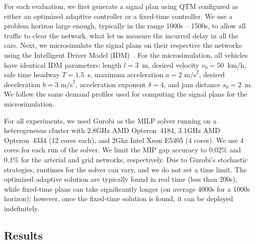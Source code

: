 For each evaluation, we first generate a signal plan using QTM configured as
either an optimized adaptive controller or a fixed-time controller.
%
We use a problem horizon \TMAX large enough, typically in the range 1000s --
1500s, to allow all traffic to clear the network, what let us measure the
incurred delay in all the cars.
%
Next, we microsimulate the signal plans on their respective the networks using
the Intelligent Driver Model (IDM)~\cite{treiber2000congested}.
%
For the microsimulation, all vehicles have identical IDM parameters: length
$l=3$~m, desired velocity $v_0 = 50$~km/h, safe time headway $T=1.5$~s, maximum
acceleration $a=2 \text{ m/s}^2$, desired deceleration $b = 3 \text{ m/s}^2$,
acceleration exponent $\delta = 4$, and jam distance $s_0 = 2$~m.
%
We follow the same demand profiles used for computing the signal plans for the
microsimulation.


For all experiments, we used Gurobi as the MILP solver running on a
heterogeneous cluster with 2.8GHz AMD Opteron~4184, 3.1GHz AMD Opteron~4334 (12
cores each), and 2Ghz Intel Xeon E5405 (4 cores). We use 4 cores for each run of
the solver.
%
We limit the MIP gap accuracy to 0.02\% and 0.1\% for the arterial and grid
networks, respectively.
%
Due to Gurobi's stochastic strategies, runtimes for the solver can vary, and we
do not set a time limit.
%
The optimized adaptive solution are typically found in real time (less than
200s), while fixed-time plans can take significantly longer (on average 4000s
for a 1000s horizon); however, once the fixed-time solution is found, it can be
deployed indefinitely.
%




\subsection{Results}


